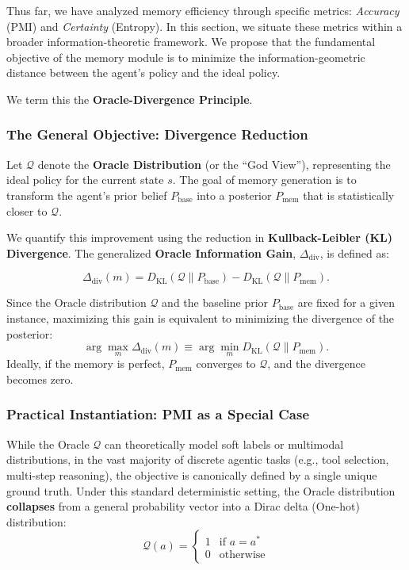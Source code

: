 Thus far, we have analyzed memory efficiency through specific metrics: \emph{Accuracy} (PMI) and \emph{Certainty} (Entropy). In this section, we situate these metrics within a broader information-theoretic framework. We propose that the fundamental objective of the memory module is to minimize the information-geometric distance between the agent's policy and the ideal policy.

We term this the \textbf{Oracle-Divergence Principle}.

\subsubsection{The General Objective: Divergence Reduction}

Let $\mathcal{Q}$ denote the \textbf{Oracle Distribution} (or the ``God View''), representing the ideal policy for the current state $s$. The goal of memory generation is to transform the agent's prior belief $P_{\text{base}}$ into a posterior $P_{\text{mem}}$ that is statistically closer to $\mathcal{Q}$.

We quantify this improvement using the reduction in \textbf{Kullback-Leibler (KL) Divergence}. The generalized \textbf{Oracle Information Gain}, $\Delta_{\text{div}}$, is defined as:

\[
\Delta_{\text{div}}(m) = D_{\text{KL}}(\mathcal{Q} \parallel P_{\text{base}}) - D_{\text{KL}}(\mathcal{Q} \parallel P_{\text{mem}}).
\]

Since the Oracle distribution $\mathcal{Q}$ and the baseline prior $P_{\text{base}}$ are fixed for a given instance, maximizing this gain is equivalent to minimizing the divergence of the posterior:
\[
\arg\max_{m} \Delta_{\text{div}}(m) \equiv \arg\min_{m} D_{\text{KL}}(\mathcal{Q} \parallel P_{\text{mem}}).
\]
Ideally, if the memory is perfect, $P_{\text{mem}}$ converges to $\mathcal{Q}$, and the divergence becomes zero.

\subsubsection{Practical Instantiation: PMI as a Special Case}

While the Oracle $\mathcal{Q}$ can theoretically model soft labels or multimodal distributions, in the vast majority of discrete agentic tasks (e.g., tool selection, multi-step reasoning), the objective is canonically defined by a single unique ground truth. Under this standard deterministic setting, the Oracle distribution \textbf{collapses} from a general probability vector into a Dirac delta (One-hot) distribution:
\[
\mathcal{Q}(a) = 
\begin{cases} 
    1 & \text{if } a = a^* \\
    0 & \text{otherwise}
\end{cases}
\]


